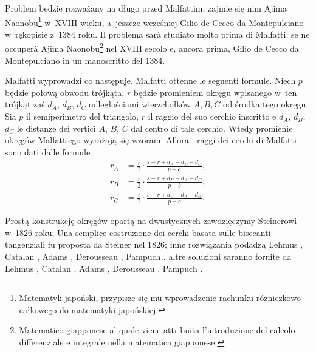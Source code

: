 Problem będzie rozważany na długo przed Malfattim, zajmie się nim Ajima Naonobu\footnote{Matematyk japoński, przypisze się mu wprowadzenie rachunku różniczkowo-całkowego do matematyki japońskiej.} w~XVIII wieku, a~jeszcze wcześniej Gilio de Cecco da Montepulciano w~rękopisie z~1384 roku. %
Il problema sarà studiato molto prima di Malfatti: se ne occuperà Ajima Naonobu\footnote{Matematico giapponese al quale viene attribuita l'introduzione del calcolo differenziale e integrale nella matematica giapponese.} nel XVIII secolo e, ancora prima, Gilio de Cecco da Montepulciano in un manoscritto del 1384. %
%
%

Malfatti wyprowadzi co następuje. %
Malfatti ottenne le seguenti formule. %
Niech $p$ będzie połową obwodu trójkąta, $r$ będzie promieniem okręgu wpisanego w~ten trójkąt zaś $d_A$, $d_B$, $d_C$ odległościami wierzchołków $A, B, C$ od środka tego okręgu. %
Sia $p$ il semiperimetro del triangolo, $r$ il raggio del suo cerchio inscritto e $d_A$, $d_B$, $d_C$ le distanze dei vertici $A$, $B$, $C$ dal centro di tale cerchio. %
Wtedy promienie okręgów Malfattiego wyrażają się wzorami %
Allora i raggi dei cerchi di Malfatti sono dati dalle formule %
\begin{align}
	r_A & = \frac r 2 \cdot {\frac {s-r+d_A-d_B-d_C}{p-a}}, \\
	r_B & = \frac r 2 \cdot {\frac {s-r+d_B-d_A-d_C}{p-b}}, \\
	r_C & = \frac r 2 \cdot {\frac {s-r+d_C-d_A-d_B}{p-c}}.
\end{align}

Prostą konstrukcję okręgów opartą na dwustycznych zawdzięczymy Steinerowi \cite{steiner_1826} w~1826 roku; %
Una semplice costruzione dei cerchi basata sulle bisecanti tangenziali fu proposta da Steiner \cite{steiner_1826} nel 1826; %
%
inne rozwiązania podadzą Lehmus \cite{lehmus_1819}, Catalan \cite{catalan_1846}, Adams \cite{adams_1846}, Derousseau \cite{derousseau_1895}, Pampuch \cite{pampuch_1904}. %
altre soluzioni saranno fornite da Lehmus \cite{lehmus_1819}, Catalan \cite{catalan_1846}, Adams \cite{adams_1846}, Derousseau \cite{derousseau_1895}, Pampuch \cite{pampuch_1904}. %

